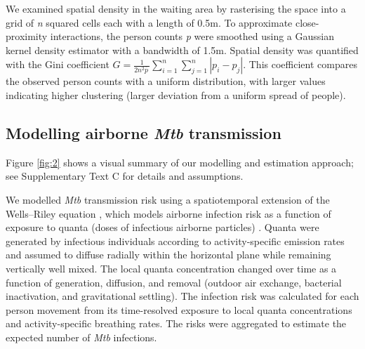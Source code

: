 \documentclass[11pt]{article}
\begin{document}
We examined spatial density in the waiting area by rasterising the space into a grid of \emph{n} squared cells each with a length of 0.5m. To approximate close-proximity interactions, the person counts \emph{p} were smoothed using a Gaussian kernel density estimator with a bandwidth of 1.5m. Spatial density was quantified with the Gini coefficient \(G = \frac{1}{2n^{2}\overline{p}\ }\sum_{i = 1}^{n}{\sum_{j = 1}^{n}{|p_{i} - p_{j}|}}\). This coefficient compares the observed person counts with a uniform distribution, with larger values indicating higher clustering (larger deviation from a uniform spread of people). \label{chg:R2.5}\label{chg:R3.3}

\subsection{\texorpdfstring{Modelling airborne \emph{Mtb} transmission}{Modelling airborne Mtb transmission}}\label{modelling-airborne-mtb-transmission}

Figure \ref{fig:2} shows a visual summary of our modelling and estimation approach; see Supplementary Text C for details and assumptions.

We modelled \emph{Mtb} transmission risk using a spatiotemporal extension of the Wells--Riley equation \cite{banholzer2025PLOSComputBiol}, which models airborne infection risk as a function of exposure to quanta (doses of infectious airborne particles) \cite{yates2016LancetInfectDis,riley1978AmJEpidemiol,rudnick2003IndoorAira}. Quanta were generated by infectious individuals according to activity-specific emission rates and assumed to diffuse radially within the horizontal plane while remaining vertically well mixed. The local quanta concentration changed over time as a function of generation, diffusion, and removal (outdoor air exchange, bacterial inactivation, and gravitational settling). The infection risk was calculated for each person movement from its time-resolved exposure to local quanta concentrations and activity-specific breathing rates. The risks were aggregated to estimate the expected number of \emph{Mtb} infections.
\end{document}
